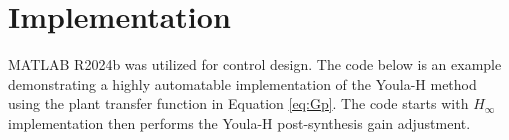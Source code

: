 \documentclass[journal,article,submit,pdftex,moreauthors]{Definitions/mdpi}
\begin{document}



\newpage
\appendixstart
\appendix

\section{Implementation}
MATLAB R2024b was utilized for control design. The code below is an example demonstrating a highly automatable implementation of the Youla-H method using the plant transfer function in Equation \ref{eq:Gp}. The code starts with $H_\infty$ implementation then performs the Youla-H post-synthesis gain adjustment. 
\end{document}
